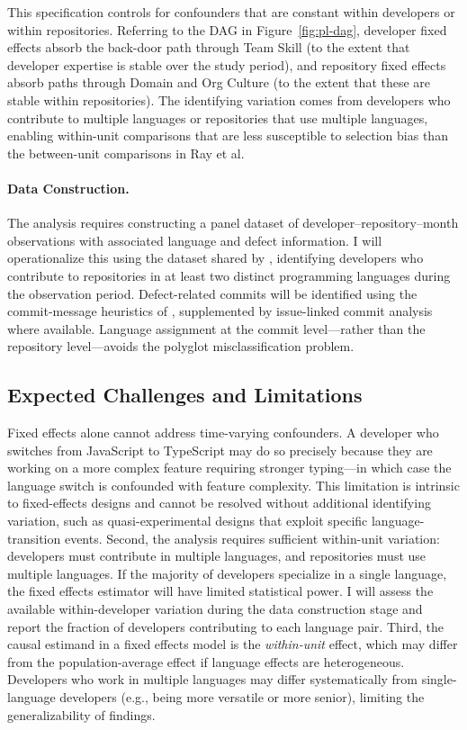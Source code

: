 This specification controls for confounders that are constant within developers or within repositories.
Referring to the DAG in Figure~\ref{fig:pl-dag}, developer fixed effects absorb the back-door path through Team Skill (to the extent that developer expertise is stable over the study period), and repository fixed effects absorb paths through Domain and Org Culture (to the extent that these are stable within repositories).
The identifying variation comes from developers who contribute to multiple languages or repositories that use multiple languages, enabling within-unit comparisons that are less susceptible to selection bias than the between-unit comparisons in Ray et al.

\paragraph{Data Construction.}
The analysis requires constructing a panel dataset of developer--repository--month observations with associated language and defect information.
I will operationalize this using the dataset shared by \citet{DBLP:journals/toplas/BergerHMVV19}, identifying developers who contribute to repositories in at least two distinct programming languages during the observation period.
Defect-related commits will be identified using the commit-message heuristics of \citet{DBLP:conf/sigsoft/RayPFD14}, supplemented by issue-linked commit analysis where available.
Language assignment at the commit level---rather than the repository level---avoids the polyglot misclassification problem.

\subsection{Expected Challenges and Limitations}

Fixed effects alone cannot address time-varying confounders.
A developer who switches from JavaScript to TypeScript may do so precisely because they are working on a more complex feature requiring stronger typing---in which case the language switch is confounded with feature complexity.
This limitation is intrinsic to fixed-effects designs and cannot be resolved without additional identifying variation, such as quasi-experimental designs that exploit specific language-transition events.
Second, the analysis requires sufficient within-unit variation: developers must contribute in multiple languages, and repositories must use multiple languages.
If the majority of developers specialize in a single language, the fixed effects estimator will have limited statistical power.
I will assess the available within-developer variation during the data construction stage and report the fraction of developers contributing to each language pair.
Third, the causal estimand in a fixed effects model is the \emph{within-unit} effect, which may differ from the population-average effect if language effects are heterogeneous.
Developers who work in multiple languages may differ systematically from single-language developers (e.g., being more versatile or more senior), limiting the generalizability of findings.

